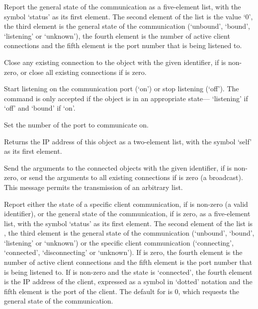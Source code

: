 

\objItemCommands[]

  \objListCmdBegin

  Report the general state of the communication as a five-element list, with the symbol `status' as
  its first element.
  The second element of the list is the value `0', the third element is the general state of the
  communication (`unbound', `bound', `listening' or `unknown'), the fourth element is the number of
  active client connections and the fifth element is the port number that is being listened to.

  Close any existing connection to the  object with the given identifier,
  if  is non-zero, or close all existing connections if  is zero.

  Start listening on the communication port (`on') or stop listening (`off').
  The command is only accepted if the  object is in an appropriate state---
  `listening' if `off' and `bound' if `on'.

  Set the number of the port to communicate on.

  Returns the IP address of this object as a two-element list, with the symbol `self' as its first
  element.
  
  Send the arguments to the connected  objects with the given identifier,
  if  is non-zero, or send the arguments to all existing connections if
   is zero (a broadcast).
  This message permits the transmission of an arbitrary list.

  Report either the state of a specific client communication, if  is non-zero
  (a valid identifier), or the general state of the communication, if  is zero,
  as a five-element list, with the symbol `status' as its first element.
  The second element of the list is , the third element is the general state of
  the communication (`unbound', `bound', `listening' or `unknown') or the specific client
  communication (`connecting', `connected', `disconnecting' or `unknown').
  If  is zero, the fourth element is the number of active client connections and
  the fifth element is the port number that is being listened to.
  If  is non-zero and the state is `connected', the fourth element is the IP
  address of the client, expressed as a symbol in `dotted' notation and the fifth element is the
  port of the client.
  The default for  is 0, which requests the general state of the communication.

